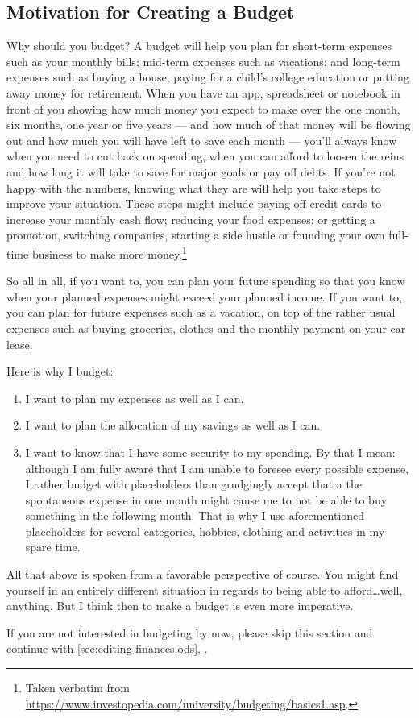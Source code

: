 \subsection{Motivation for Creating a Budget}
\label{subsec:motivation-creating-budget}

Why should you budget? A budget will help you plan for short-term expenses such as your monthly bills; mid-term expenses such as vacations; and long-term expenses such as buying a house, paying for a child’s college education or putting away money for retirement.
When you have an app, spreadsheet or notebook in front of you showing how much money you expect to make over the one month, six months, one year or five years --- and how much of that money will be flowing out and how much you will have left to save each month --- you’ll always know when you need to cut back on spending, when you can afford to loosen the reins and how long it will take to save for major goals or pay off debts.
If you’re not happy with the numbers, knowing what they are will help you take steps to improve your situation.
These steps might include paying off credit cards to increase your monthly cash flow; reducing your food expenses; or getting a promotion, switching companies, starting a side hustle or founding your own full-time business to make more money.\footnote{Taken verbatim from \url{https://www.investopedia.com/university/budgeting/basics1.asp}.}

So all in all, if you want to, you can plan your future spending so that you know when your planned expenses might exceed your planned income.
If you want to, you can plan for future expenses such as a vacation, on top of the rather usual expenses such as buying groceries, clothes and the monthly payment on your car lease.

Here is why I budget:
\begin{enumerate}
	\item I want to plan my expenses as well as I can.
	\item I want to plan the allocation of my savings as well as I can.
	\item I want to know that I have some security to my spending.
	By that I mean: although I am fully aware that I am unable to foresee every possible expense, I rather budget with placeholders than grudgingly accept that a the spontaneous expense in one month might cause me to not be able to buy something in the following month.
	That is why I use aforementioned placeholders for several categories, \eg hobbies, clothing and activities in my spare time.
\end{enumerate}

All that above is spoken from a favorable perspective of course.
You might find yourself in an entirely different situation in regards to being able to afford\ldots well, anything.
But I think then to make a budget is even more imperative.

\begin{specialnote}
	If you are not interested in budgeting by now, please skip this section and continue with \autoref{sec:editing-finances.ods}, .
\end{specialnote}

